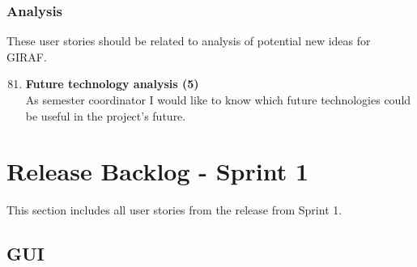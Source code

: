 \subsubsection{Analysis}
These user stories should be related to analysis of potential new ideas for GIRAF.

\begin{enumerate}
	\setcounter{enumi}{80} %
	\item \textbf{Future technology analysis (5)}\\
	As semester coordinator I would like to know which future technologies could be useful in the project’s future.
\end{enumerate}

\section{Release Backlog - Sprint 1}
This section includes all user stories from the release from Sprint 1.

\subsection{GUI}


